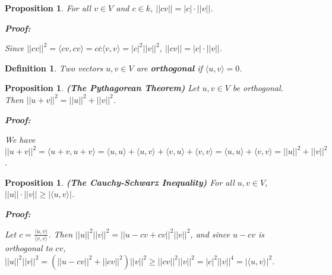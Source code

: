 \documentclass{article}
\theoremstyle{colontheorem}
\newtheorem{proposition}[theorem]{Proposition}
\newtheorem{definition}[theorem]{Definition}
\newenvironment{Proposition}
{
	\begin{mdframed}[backgroundcolor=TheoremOrange!10]
	\begin{proposition}
}
{
	\end{proposition}
	\end{mdframed}
	
	\vspace{.15in}
}
\newenvironment{Def}
{
	\begin{mdframed}[backgroundcolor=DefGreen!10]
	\begin{definition}
}
{
	\end{definition}
	\end{mdframed}
	
	\vspace{.15in}
}
\newenvironment{Proof}
{
	\begin{mdframed}[backgroundcolor=ProofPurple!10]
	\textbf{Proof:}%
}
{
	\end{mdframed}
	
	\vspace{.085in}
}
\begin{document}
\begin{Proposition}
	
	For all $v \in V$ and $c \in k$, $||cv|| = |c| \cdot ||v||$.
	
	\begin{Proof}
		Since $||cv||^2 = \langle cv, cv \rangle = c \overline{c} \langle v, v \rangle = |c|^2 ||v||^2$, $||cv|| = |c| \cdot ||v||$.
		
	\end{Proof}
	
\end{Proposition}



\begin{Def}
	
	Two vectors $u, v \in V$ are \textbf{orthogonal} if $\langle u, v \rangle = 0$.
	
\end{Def}



\begin{Proposition}
	
	\textbf{(The Pythagorean Theorem)} Let $u, v \in V$ be orthogonal. Then $||u + v||^2 = ||u||^2 + ||v||^2$.
	
	\begin{Proof}
		We have $||u + v||^2 = \langle u+v, u+v \rangle = \langle u, u \rangle + \langle u, v \rangle + \langle v, u \rangle + \langle v, v \rangle = \langle u, u \rangle + \langle v, v \rangle = ||u||^2 + ||v||^2$.
		
	\end{Proof}
	
\end{Proposition}



\begin{Proposition}
	
	\textbf{(The Cauchy-Schwarz Inequality)} For all $u, v \in V$, $||u|| \cdot ||v|| \geq | \langle u, v \rangle |$.
	
	\begin{Proof}
		Let $c = \frac{\langle u, v \rangle}{\langle v, v \rangle}$. Then $||u||^2 ||v||^2 = ||u - cv + cv||^2 ||v||^2$, and since $u - cv$ is orthogonal to $cv$, $||u||^2 ||v||^2 = \left( ||u - cv||^2 + ||cv||^2 \right) ||v||^2 \geq ||cv||^2 ||v||^2 = |c|^2 ||v||^4 = | \langle u, v \rangle |^2$.
		
	\end{Proof}
	
\end{Proposition}
\end{document}
